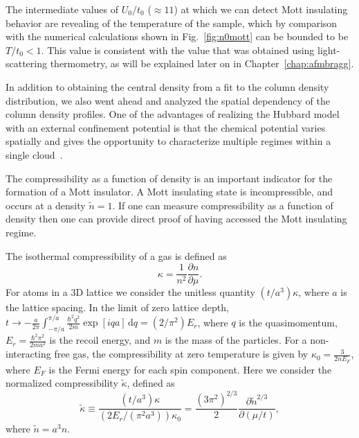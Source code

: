 The intermediate values of $U_{0}/t_{0}$ ($\approx 11$) at which we can detect
Mott insulating behavior are revealing of the temperature of the sample,  which
by comparison with the numerical calculations shown in Fig.~\ref{fig:n0mott}
can be bounded to be $T/t_{0}<1$.  This value is consistent with the value that
was obtained using light-scattering thermometry, as will be explained later on
in Chapter~\ref{chap:afmbragg}.  

 
In addition to obtaining the central density from a fit to the column density
distribution, we also went ahead and analyzed the spatial dependency of the
column density profiles. One of the advantages of realizing the Hubbard model
with an external confinement potential is that the chemical potential varies
spatially and gives the opportunity to characterize multiple regimes within a
single cloud~\cite{Gemelke2009}. 

The compressibility as a function of density is an important indicator for the
formation of a Mott insulator.   A Mott insulating state is incompressible, and
occurs at a density $\tilde{n}=1$.  If one can measure compressibility as
a function of density then one can provide direct proof of having accessed the
Mott insulating regime.  
 
The isothermal compressibility of a gas is defined as 
\begin{equation}
    \kappa = \frac{1}{n^{2}} \frac{ \partial n }{ \partial \mu }. 
\end{equation} 
For atoms in a 3D lattice we consider the unitless quantity $(t/a^{3})\kappa$,
where $a$ is the lattice spacing.  In the limit of zero lattice depth,
$t\rightarrow - \frac{a}{2\pi} \int_{-\pi/a}^{\pi/a} \frac{\hbar^{2}q^{2}}{2m}
\exp[ i q a]\,\text{d}q = (2/\pi^{2}) E_{r}$, where $q$ is the quasimomentum,
$E_{r} = \frac{ \hbar^{2} \pi^{2}}{ 2ma^{2} } $ is the recoil energy, and $m$
is the mass of the particles.   For a non-interacting free gas, the
compressibility at zero temperature is given by $\kappa_{0} = \frac{
3}{2nE_{F}}$, where $E_{F}$ is the Fermi energy for each spin component. Here
we consider the normalized compressibility $\tilde{\kappa}$, defined as 
\begin{equation} 
\tilde{\kappa} \equiv  \frac{ (t/a^{3})\kappa  } 
                       {( 2E_{r} /(\pi^{2}a^{3})) \kappa_{0}} =  
             \frac{ (3\pi^{2})^{2/3} }{ 2 } 
             \frac{ \partial \tilde{n}^{2/3} }{ \partial (\mu/t) },
\end{equation}
where $\tilde{n} = a^{3}n$.

